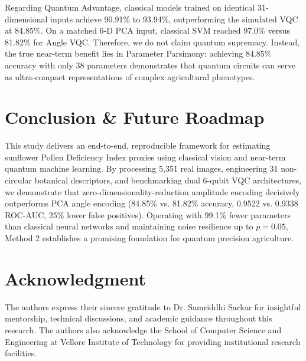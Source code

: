 \documentclass{ieeeaccess}
\begin{document}
Regarding Quantum Advantage, classical models trained on identical 31-dimensional inputs achieve 90.91\% to 93.94\%, outperforming the simulated VQC at 84.85\%. On a matched 6-D PCA input, classical SVM reached 97.0\% versus 81.82\% for Angle VQC. Therefore, we do not claim quantum supremacy. Instead, the true near-term benefit lies in Parameter Parsimony: achieving 84.85\% accuracy with only 38 parameters demonstrates that quantum circuits can serve as ultra-compact representations of complex agricultural phenotypes.

\section{Conclusion \& Future Roadmap}
\label{sec:conclusion}
This study delivers an end-to-end, reproducible framework for estimating sunflower Pollen Deficiency Index proxies using classical vision and near-term quantum machine learning. By processing 5,351 real images, engineering 31 non-circular botanical descriptors, and benchmarking dual 6-qubit VQC architectures, we demonstrate that zero-dimensionality-reduction amplitude encoding decisively outperforms PCA angle encoding (84.85\% vs. 81.82\% accuracy, 0.9522 vs. 0.9338 ROC-AUC, 25\% lower false positives). Operating with 99.1\% fewer parameters than classical neural networks and maintaining noise resilience up to $p = 0.05$, Method 2 establishes a promising foundation for quantum precision agriculture.

\section*{Acknowledgment}
The authors express their sincere gratitude to Dr. Samriddhi Sarkar for insightful mentorship, technical discussions, and academic guidance throughout this research. The authors also acknowledge the School of Computer Science and Engineering at Vellore Institute of Technology for providing institutional research facilities.
\end{document}
